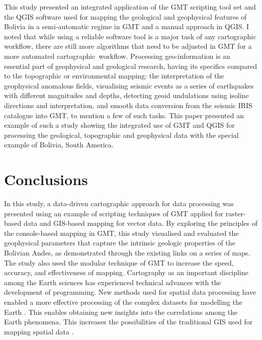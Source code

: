 \documentclass[data,article,accept,pdftex,moreauthors]{Definitions/mdpi}
\begin{document}
This study presented an integrated application of the GMT scripting tool set and {the} QGIS software {used} for mapping the geological and geophysical {features} of Bolivia in a semi-automatic regime {in} GMT and {a} manual {approach in} QGIS. I noted that while using a reliable software tool is a major task of any cartographic {workflow}, there are still more algorithms that need to be {adjusted} in GMT for a more automated \mbox{cartographic workflow}. Processing geo-information{ is} an essential part of geophysical and geological research, having its specifics compared to the topographic or environmental mapping: {the} interpretation of {the} geophysical anomalous fields, visualising seismic events as {a series of} earthquakes {with different magnitudes and depths, detecting} geoid undulations {using} isoline directions and interpretation, and smooth data conversion from {the} seismic IRIS catalogue into GMT, {to mention a few of such tasks. This paper presented an example of such a study showing the integrated use of GMT and QGIS for processing the} geological, topographic and geophysical data{ with the special example of Bolivia, South America.} 

\section{Conclusions}

In this study, a {data-driven} cartographic approach for data processing was presented using an example of scripting techniques of GMT applied for raster-based data and {}GIS-based mapping for vector data. By exploring {the} principles of {the} console-based mapping in {GMT, }this study {visualised and evaluated} the geophysical parameters that capture the intrinsic geologic properties of the Bolivian Andes{, as demonstrated through} the existing links {on} a series of maps. The study also {used} the modular technique of GMT to increase the speed, accuracy, and effectiveness of mapping. {Cartography as an important discipline among the} Earth sciences has experienced {technical advances with the development of programming}. {New methods used for} spatial data processing{ have enabled a more effective processing of the complex datasets for modelling the Earth} \cite{Bar,LOMBARDO,Lemenkova2020e}. {This enables obtaining} new insights into the correlations among the Earth phenomena{. This increases the possibilities of the traditional }GIS {used for mapping} spatial data \cite{Millington,Lemenkova202137}. 	
\end{document}
